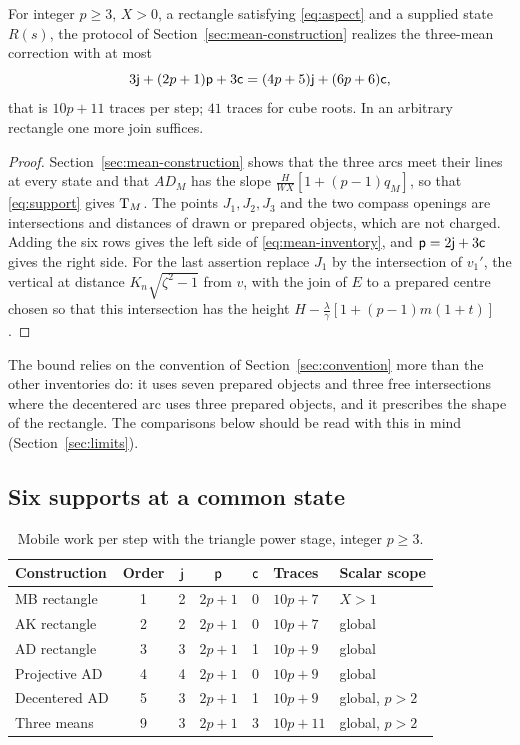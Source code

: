 \begin{proposition}\label{prop:mean-inventory}
For integer $p\ge3$, $X>0$, a rectangle satisfying \eqref{eq:aspect} and a supplied state $R(s)$, the
protocol of Section~\ref{sec:mean-construction} realizes the three-mean correction with at most
\begin{equation}\label{eq:mean-inventory}
3\mathsf{j}+(2p+1)\mathsf{p}+3\mathsf{c}=(4p+5)\mathsf{j}+(6p+6)\mathsf{c},
\end{equation}
that is $10p+11$ traces per step; $41$ traces for cube roots. In an arbitrary rectangle one more join
suffices.
\end{proposition}
\begin{proof}
Section~\ref{sec:mean-construction} shows that the three arcs meet their lines at every state and that
$AD_M$ has the slope $\tfrac{H}{WX}[1+(p-1)q_M]$, so that \eqref{eq:support} gives $\mathrm{T}_M$. The points
$J_1,J_2,J_3$ and the two compass openings are intersections and distances of drawn or prepared
objects, which are not charged. Adding the six rows gives the left side of
\eqref{eq:mean-inventory}, and $\mathsf{p}=2\mathsf{j}+3\mathsf{c}$ gives the right side. For the last assertion replace
$J_1$ by the intersection of $v_1'$, the vertical at distance $K_n\sqrt{\zeta^{2}-1}$ from $v$, with
the join of $E$ to a prepared centre chosen so that this intersection has the height
$H-\tfrac\lambda\gamma[1+(p-1)m(1+t)]$.
\end{proof}

The bound relies on the convention of Section~\ref{sec:convention} more than the other inventories do:
it uses seven prepared objects and three free intersections where the decentered arc uses three
prepared objects, and it prescribes the shape of the rectangle. The comparisons below should be read
with this in mind (Section~\ref{sec:limits}).

\subsection{Six supports at a common state}

\begin{table}[h]
\centering\small
\caption{Mobile work per step with the triangle power stage, integer $p\ge3$.}\label{tab:mobile}
\begin{tabular}{@{}lccccll@{}}
\toprule
Construction & Order & $\mathsf{j}$ & $\mathsf{p}$ & $\mathsf{c}$ & Traces & Scalar scope\\
\midrule
MB rectangle & 1 & 2 & $2p+1$ & 0 & $10p+7$ & $X>1$\\
AK rectangle & 2 & 2 & $2p+1$ & 0 & $10p+7$ & global\\
AD rectangle & 3 & 3 & $2p+1$ & 1 & $10p+9$ & global\\
Projective AD & 4 & 4 & $2p+1$ & 0 & $10p+9$ & global\\
Decentered AD & 5 & 3 & $2p+1$ & 1 & $10p+9$ & global, $p>2$\\
Three means & 9 & 3 & $2p+1$ & 3 & $10p+11$ & global, $p>2$\\
\bottomrule
\end{tabular}
\end{table}

